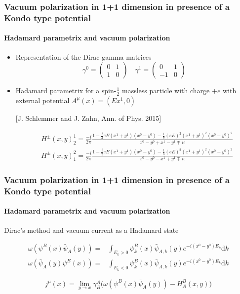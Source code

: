 \documentclass[french]{beamer}
\newcommand{\dd}[0]{\textrm{d}}
\begin{document}
\begin{frame}[shrink=20]
\frametitle{Vacuum polarization in 1+1 dimension in presence of a Kondo type potential}
\framesubtitle{Hadamard parametrix and vacuum polarization}

\begin{itemize}
\item Representation of the Dirac gamma matrices
\begin{equation*}
\gamma^0 = \begin{pmatrix}
0 & 1 \\
1 & 0 \end{pmatrix}  \quad  \gamma^1 = \begin{pmatrix}
0  & 1 \\
-1 & 0
\end{pmatrix}
\end{equation*}

\item Hadamard parametrix for a spin-$\frac 1 2$ massless particle with charge $+e$ with external potential $A^\mu(x) = (Ex^1, 0 )$

\color{blue}[J. Schlemmer and J. Zahn, Ann. of Phys. 2015]\color{black}

\begin{equation*}
\begin{split}
& H^\pm (x, y)^1_2 = \frac{-i}{2\pi}\frac{1-\frac i 2 e E(x^1 + y^1)(x^0-y^0) 
- \frac 1 8 (eE)^2(x^1 + y^1)^2(x^0 - y^0)^2}{x^0 - y^0 + x^1 - y^1 \mp i \epsilon}  \\
& H^\pm (x, y)^2_1 = \frac{-i}{2\pi}\frac{1-\frac i 2 e E(x^1 + y^1)(x^0-y^0) 
- \frac 1 8 (eE)^2(x^1 + y^1)^2(x^0 - y^0)^2}{x^0 - y^0 - x^1 + y^1 \mp i \epsilon}
\end{split}
\end{equation*}

\end{itemize}

\end{frame}
\begin{frame}
\frametitle{Vacuum polarization in 1+1 dimension in presence of a Kondo type potential}
\framesubtitle{Hadamard parametrix and vacuum polarization}

 Dirac's method and vacuum current as a Hadamard state

\begin{equation*}
\begin{split}
\omega(\psi^B(x)\bar{\psi}_A(y)) = & \int_{E_k >0} \psi_k^B(x)\bar{\psi}_{A,k}(y)e^{-i(x^0-y^0)E_k} \dd k \\
\omega(\bar{\psi}_A(y)\psi^B(x)) = & \int_{E_k <0} \psi_k^B(x)\bar{\psi}_{A,k}(y)e^{-i(x^0-y^0)E_k} \dd k 
\end{split}
\end{equation*}

\begin{equation*}
j^\mu(x) = \lim_{y \rightarrow x} \gamma^A_B \big(
\omega(\psi^B(x)\bar{\psi}_A(y)) - H^B_A (x, y)\big)
\end{equation*}

\end{frame}
\end{document}
